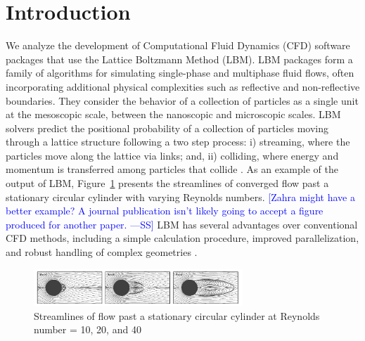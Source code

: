 \documentclass[final, 3p, times, authoryear]{elsarticle}
\newcommand{\authornote}[3]{\textcolor{#1}{[#3 ---#2]}}
\newcommand{\authornote}[3]{}
\newcommand{\wss}[1]{\authornote{blue}{SS}{#1}} %
\begin{document}

\section{Introduction} \label{secIntro}

We analyze the development of Computational Fluid Dynamics (CFD) software
packages that use the Lattice Boltzmann Method (LBM). LBM packages form a family
of algorithms for simulating single-phase and multiphase fluid flows, often
incorporating additional physical complexities \citep{chen1998lattice} such as
reflective and non-reflective boundaries. They consider the behavior of a
collection of particles as a single unit at the mesoscopic scale, between the
nanoscopic and microscopic scales. LBM solvers predict the positional
probability of a collection of particles moving through a lattice structure
following a two step process: i) streaming, where the particles
move along the lattice via links; and, ii) colliding, where energy and
momentum is transferred among particles that collide \citep{bao2011lattice}. As
an example of the output of LBM, Figure~\ref{circularflow} presents the streamlines of
converged flow past a stationary circular cylinder with varying Reynolds numbers.
\wss{Zahra might have a better example?  A journal publication isn't likely
going to accept a figure produced for another paper.}  LBM has several
advantages over conventional CFD methods, including a simple calculation
procedure, improved parallelization, and robust handling of complex geometries
\citep{ganji2015application}.

\begin{figure}[h!]
	\begin{center}
		\includegraphics[width=0.7\textwidth]{./figures/circularflow}
		\caption{Streamlines of flow past a stationary circular cylinder at
		Reynolds number = 10, 20, and 40 \citep{chen2021phase}}
		\label{circularflow}
	\end{center}
\end{figure}
\end{document}
